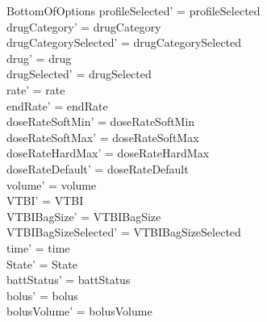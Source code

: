 \begin{schema}{BottomOfOptions}
	profileSelected' = profileSelected\\
	drugCategory' = drugCategory\\ 
	drugCategorySelected' = drugCategorySelected\\
	drug' = drug\\ 
	drugSelected' = drugSelected\\
	rate' = rate\\
	endRate' = endRate\\
	doseRateSoftMin' = doseRateSoftMin\\
	doseRateSoftMax' = doseRateSoftMax\\
	\pagebreak
	doseRateHardMax' = doseRateHardMax\\
	doseRateDefault' = doseRateDefault\\
	volume' = volume\\
	VTBI' = VTBI\\
	VTBIBagSize' = VTBIBagSize\\ VTBIBagSizeSelected' = VTBIBagSizeSelected\\
	time' = time\\ State' = State\\
	battStatus' = battStatus\\
	bolus' = bolus\\
	bolusVolume' = bolusVolume\\

\end{schema}
